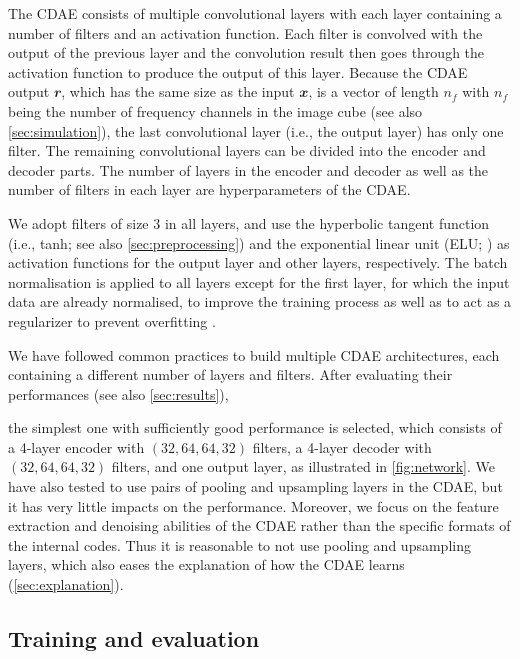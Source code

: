 \documentclass[fleqn,usenatbib]{mnras}
\newcommand{\B}[1]{\mathbfit{#1}}
\newcommand{\editwip}[1]{{\leavevmode\color{magenta}#1}}
\begin{document}
\editwip{%
The CDAE consists of multiple convolutional layers with each layer
containing a number of filters and an activation function.
Each filter is convolved with the output of the previous layer and the
convolution result then goes through the activation function to produce
the output of this layer.
Because the CDAE output $\B{r}$, which has the same size as the input
$\B{x}$, is a vector of length $n_f$ with $n_f$ being the number of
frequency channels in the image cube (see also \autoref{sec:simulation}),
the last convolutional layer (i.e., the output layer) has only one filter.
The remaining convolutional layers can be divided into the encoder and
decoder parts.
The number of layers in the encoder and decoder as well as the number of
filters in each layer are hyperparameters of the CDAE.

We adopt filters of size 3 in all layers, and use the hyperbolic tangent
function (i.e., tanh; see also \autoref{sec:preprocessing}) and the
exponential linear unit (ELU; \citealt{clevert2016}) as activation
functions for the output layer and other layers, respectively.
The batch normalisation is applied to all layers except for the first
layer, for which the input data are already normalised, to improve the
training process as well as to act as a regularizer to prevent overfitting
\citep{ioffe2015}.

We have followed common practices \citep[e.g.,][]{suganuma2018,geron2017}
to build multiple CDAE architectures, each containing a different number of
layers and filters.
After evaluating their performances (see also \autoref{sec:results}),} %
the simplest one with sufficiently good performance is selected,
which consists of a 4-layer encoder with $(32,64,64,32)$ filters,
a 4-layer decoder with $(32,64,64,32)$ filters, and one output layer,
as illustrated in \autoref{fig:network}.
\editwip{%
We have also tested to use pairs of pooling and upsampling layers in the
CDAE, but it has very little impacts on the performance.
Moreover, we focus on the feature extraction and denoising abilities of the
CDAE rather than the specific formats of the internal codes.
Thus it is reasonable to not use pooling and upsampling layers, which also
eases the explanation of how the CDAE learns (\autoref{sec:explanation}).
}


\subsection{Training and evaluation}
\label{sec:train-eval}
\end{document}

